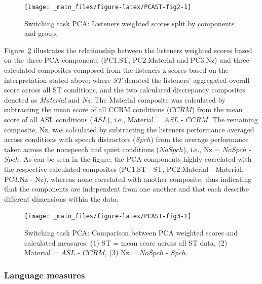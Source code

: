 \documentclass[a4paper, twoside]{templates/ociamthesis}
\begin{document}
\begin{figure}

{\centering \texttt{[image: \_main\_files/figure-latex/PCAST-fig2-1]} 

}

\caption{Switching task PCA: Listeners weighted scores split by components and group.}\label{fig:PCAST-fig2}
\end{figure}

Figure~\ref{fig:PCAST-fig3} illustrates the relationship between the listeners weighted scores based on the three PCA components (PC1.ST, PC2.Material and PC3.Nz) and three calculated composites composed from the listeners z-scores based on the interpretation stated above; where \emph{ST} denoted the listeners' aggregated overall score across all ST conditions, and the two calculated discrepancy composites denoted as \emph{Material} and \emph{Nz}. The Material composite was calculated by subtracting the mean score of all CCRM conditions (\(\overline{CCRM}\)) from the mean score of all ASL conditions (\(\overline{ASL}\)), i.e., Material = \(\overline{ASL}\) - \(\overline{CCRM}\). The remaining composite, Nz, was calculated by subtracting the listeners performance averaged across conditions with speech distractors (\(\overline{Spch}\)) from the average performance taken across the nonspeech and quiet conditions (\(\overline{NoSpch}\)), i.e., Nz = \(\overline{NoSpch}\) - \(\overline{Spch}\). As can be seen in the figure, the PCA components highly correlated with the respective calculated composites (PC1.ST - ST, PC2.Material - Material, PC3.Nz - Nz), whereas none correlated with another composite, thus indicating that the components are independent from one another and that each describe different dimensions within the data.\\

\begin{figure}

{\centering \texttt{[image: \_main\_files/figure-latex/PCAST-fig3-1]} 

}

\caption{Switching task PCA: Comparison between PCA weighted scores and calculated measures: (1) ST = mean score across all ST data, (2) Material = $\overline{ASL}$ - $\overline{CCRM}$, (3) Nz = $\overline{NoSpch}$ - $\overline{Spch}$.}\label{fig:PCAST-fig3}
\end{figure}

\hypertarget{language-measures}{%
\subsubsection{Language measures}\label{language-measures}}
\end{document}
